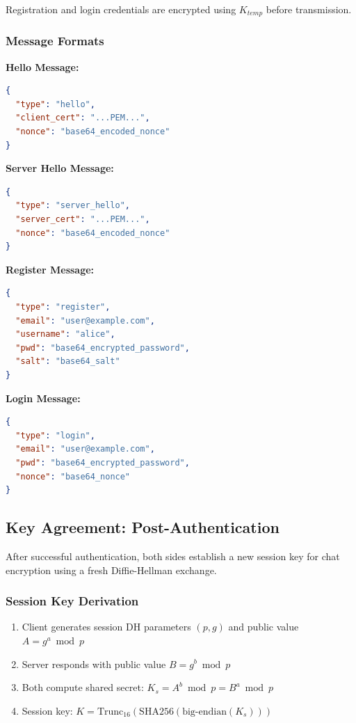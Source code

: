 \documentclass[runningheads]{llncs}
\begin{document}
Registration and login credentials are encrypted using $K_{temp}$ before transmission.

\subsubsection{Message Formats}

\textbf{Hello Message:}
\begin{lstlisting}[language=json]
{
  "type": "hello",
  "client_cert": "...PEM...",
  "nonce": "base64_encoded_nonce"
}
\end{lstlisting}

\textbf{Server Hello Message:}
\begin{lstlisting}[language=json]
{
  "type": "server_hello",
  "server_cert": "...PEM...",
  "nonce": "base64_encoded_nonce"
}
\end{lstlisting}

\textbf{Register Message:}
\begin{lstlisting}[language=json]
{
  "type": "register",
  "email": "user@example.com",
  "username": "alice",
  "pwd": "base64_encrypted_password",
  "salt": "base64_salt"
}
\end{lstlisting}

\textbf{Login Message:}
\begin{lstlisting}[language=json]
{
  "type": "login",
  "email": "user@example.com",
  "pwd": "base64_encrypted_password",
  "nonce": "base64_nonce"
}
\end{lstlisting}

\subsection{Key Agreement: Post-Authentication}

After successful authentication, both sides establish a new session key for chat encryption using a fresh Diffie-Hellman exchange.

\subsubsection{Session Key Derivation}

\begin{enumerate}
    \item Client generates session DH parameters $(p, g)$ and public value $A = g^a \bmod p$
    \item Server responds with public value $B = g^b \bmod p$
    \item Both compute shared secret: $K_s = A^b \bmod p = B^a \bmod p$
    \item Session key: $K = \text{Trunc}_{16}(\text{SHA256}(\text{big-endian}(K_s)))$
\end{enumerate}
\end{document}
